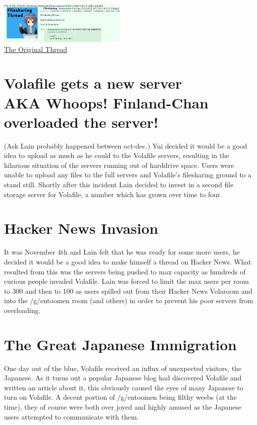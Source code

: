 \documentclass[12pt]{report}
\begin{document}
{        \begin{image}
            \flushright
            \includegraphics[scale=0.25]{images/VolafileOrigTechnologyPost.jpg}\\
            \href{http://archive.rebeccablacktech.com/g/thread/S36862456}{The Original Thread}
            \label{fig:Never Forget}
        \end{image}

        \section[Volafile gets a new server]{Volafile gets a new server \\ AKA Whoops! Finland-Chan overloaded the server!}
        (Ask Lain probably happened between oct-dec.) Yui decided it would
        be a good idea to upload as much as he could to the Volafile servers,
        resulting in the hilarious situation of the servers running out of
        harddrive space. Users were unable to upload any files to the full
        servers and Volafile's filesharing ground to a stand still. Shortly
        after this incident Lain decided to invest in a second file storage
        server for Volafile, a number which has grown over time to four.

        \vfill
        \pagebreak

        \section{Hacker News Invasion}
        It was November 4th and Lain felt that he was ready for some more
        users, he decided it would be a good idea to make himself a
        thread on Hacker News\footnotemark .
        What resulted from this was the servers being pushed to max
        capacity as hundreds of curious people invaded Volafile.
        Lain was forced to limit the max users per room to 300 and
        then to 100 as users spilled out from their Hacker News
        Volaroom and into the /g/entoomen room (and others) in
        order to prevent his poor servers from overloading.

        \section{The Great Japanese Immigration}
        One day out of the blue, Volafile received an influx
        of unexpected visitors, the Japanese. As it turns out
        a popular Japanese blog had discovered Volafile and
        written an article about it, this obviously caused
        the eyes of many Japanese to turn on Volafile. A decent
        portion of /g/entoomen being filthy weebs (at the time),
        they of course were both over joyed and highly amused as
        the Japanese users attempted to communicate with them. %

}
\end{document}

